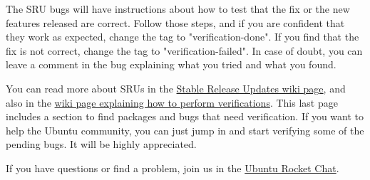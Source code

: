 \documentclass[12pt]{article}
\begin{document}
The SRU bugs will have instructions about how to test that the fix or the new
features released are correct. Follow those steps, and if you are confident
that they work as expected, change the tag to "verification-done". If you find
that the fix is not correct, change the tag to "verification-failed". In case
of doubt, you can leave a comment in the bug explaining what you tried and what
you found.

You can read more about SRUs in the
\href{https://wiki.ubuntu.com/StableReleaseUpdates}
     {Stable Release Updates wiki page},
and also in the
\href{https://wiki.ubuntu.com/QATeam/PerformingSRUVerification}
     {wiki page explaining how to perform verifications}.
This last page includes a section to find packages and bugs that need
verification. If you want to help the Ubuntu community, you can just jump in
and start verifying some of the pending bugs. It will be highly appreciated.

If you have questions or find a problem, join us in the
\href{https://rocket.ubuntu.com/channel/community}{Ubuntu Rocket Chat}.
\end{document}
